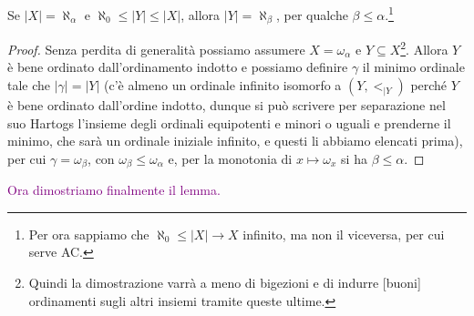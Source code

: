 \begin{remark}
	Se $|X| = \aleph_\alpha$ e $\aleph_0 \leq |Y| \leq |X|$, allora $|Y| = \aleph_\beta$, per qualche $\beta \leq \alpha$.\footnote{Per ora sappiamo che $\aleph_0 \leq |X| \to X$ infinito, ma non il viceversa, per cui serve AC.}
\end{remark}

\begin{proof}
	Senza perdita di generalità possiamo assumere $X = \omega_\alpha$ e $Y \subseteq X$\footnote{Quindi la dimostrazione varrà a meno di bigezioni e di indurre [buoni] ordinamenti sugli altri insiemi tramite queste ultime.}. Allora $Y$ è bene ordinato dall'ordinamento indotto e possiamo definire $\gamma$ il minimo ordinale 
	tale che $|\gamma| = |Y|$ (c'è almeno un ordinale infinito isomorfo a $(Y,<_{|Y})$ perché $Y$ è bene ordinato dall'ordine indotto, dunque si può scrivere per separazione nel suo Hartogs l'insieme degli ordinali equipotenti e minori o uguali e prenderne il minimo, che sarà un ordinale iniziale infinito, e questi li abbiamo
	elencati prima), per cui $\gamma = \omega_\beta$, con $\omega_\beta \leq \omega_\alpha$ e, per la monotonia di $x \mapsto \omega_x$ si ha $\beta \leq \alpha$. 
\end{proof}

\textcolor{purple}{Ora dimostriamo finalmente il lemma.}

